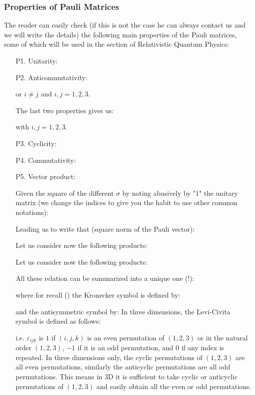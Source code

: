 	\subsubsection{Properties of Pauli Matrices}
	The reader can easily check (if this is not the case he can always contact us and we will write the details) the following main properties of the Pauli matrices, some of which will be used in the section of Relativistic Quantum Physics:
	\begin{enumerate}
		\item[P1.] Unitarity:
		

		\item[P2.] Anticommutativity:
		
		or $i\neq j$ and $i,j=1,2,3$.

		The last two properties gives us:
		
		with $i,j=1,2,3$.

		\item[P3.] Cyclicity:
		

		\item[P4.] Commutativity:
		
		
		\item[P5.] Vector product:
		
		Given the square of the different $\sigma$ by noting abusively by "$1$" the unitary matrix (we change the indices to give you the habit to use other common notations):
		
		Leading us to write that (square norm of the Pauli vector):
		
		Let us consider now the following products:
		
		Let us consider now the following products:
		
		All these relation can be summarized into a unique one (!):
		
		where for recall () the Kronecker symbol is defined by:
		
		and the antisymmetric symbol by:
		In three dimensions, the Levi-Civita symbol is defined as follows:
		
		i.e.  $\varepsilon_{ijk}$  is $1$ if $(i, j, k)$ is an even permutation of $(1,2,3)$ or in the natural order $(1,2,3)$, $-1$ if it is an odd permutation, and $0$ if any index is repeated. In three dimensions only, the cyclic permutations of $(1,2,3)$ are all even permutations, similarly the anticyclic permutations are all odd permutations. This means in 3D it is sufficient to take cyclic or anticyclic permutations of $(1,2,3)$ and easily obtain all the even or odd permutations.
		

\end{enumerate}
